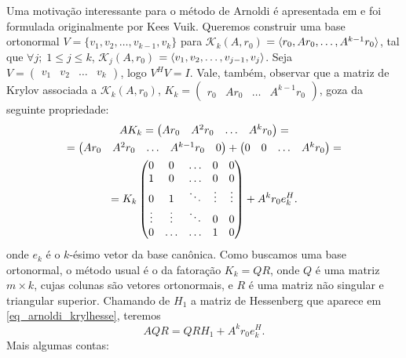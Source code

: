 Uma motivação interessante para o método de Arnoldi é apresentada em \cite[pág. 337]{Meurant1999Computer} e foi formulada originalmente por Kees Vuik. Queremos construir uma base ortonormal $V=\{v_1,v_2,\ldots,v_{k-1},v_k\}$ para $\mathcal{K}_k(A,r_0)$ $={\langle r_0,Ar_0,\ldots,A^{k-1}r_0\rangle}$, tal que $\forall j;\; 1\leqslant j\leqslant  k$, $\mathcal{K}_j(A,r_0)$ $={\langle v_1,v_2,\ldots,v_{j-1},v_j\rangle}$. Seja $V=\begin{pmatrix}v_1&v_2&\ldots &v_k\end{pmatrix}$, logo $V^HV=I$. Vale, também, observar que a matriz de Krylov  associada a $\mathcal{K}_k(A,r_0)$, ${K}_k=\begin{pmatrix} r_0&Ar_0&\ldots&A^{k-1}r_0\end{pmatrix}$, goza da seguinte propriedade:
\begin{gather}
A{K}_k=\begin{pmatrix} Ar_0&A^2r_0&\ldots&A^kr_0\end{pmatrix}=\notag\\
=\begin{pmatrix} Ar_0&A^2r_0&\ldots&A^{k-1}r_0&0\end{pmatrix} +\begin{pmatrix} 0&0&\ldots&A^kr_0\end{pmatrix}=\notag\\
={K}_k\begin{pmatrix}
0 & 0 & \ldots & 0 & 0 \\
1 & 0 & \ldots & 0 & 0  \\
0 & 1& \ddots & \vdots & \vdots\\
\vdots & \vdots & \ddots & 0 & 0\\
0 & \ldots & \ldots & 1 & 0 \\
\end{pmatrix}+A^kr_0e_k^H. \label{eq_arnoldi_krylhesse}
\end{gather}
onde $e_k$ é o $k$-ésimo vetor da base canônica. Como buscamos uma base ortonormal, o método usual é o da fatoração ${K}_k=QR$, onde $Q$ é uma matriz $m\times k$, cujas colunas são vetores ortonormais, e $R$ é uma matriz não singular e triangular superior. Chamando de $H_1$ a matriz de Hessenberg que aparece em \eqref{eq_arnoldi_krylhesse}, teremos
\[AQR=QRH_1+A^kr_0e_k^H.\]
Mais algumas contas:

